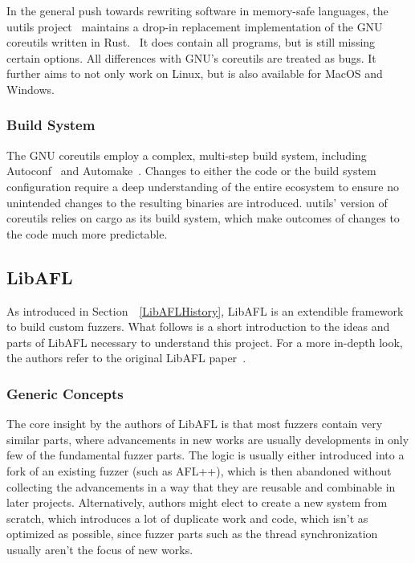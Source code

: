 \documentclass{article}
\let\savedCite=\cite
\renewcommand{\cite}{\unskip~\savedCite}
\let\savedRef=\ref
\renewcommand{\ref}{\unskip~\savedRef}
\begin{document}
\begin{multicols}{2}
    In the general push towards rewriting software in memory-safe languages, the uutils project\cite{Uutils} maintains a drop-in replacement implementation of the GNU coreutils written in Rust.\cite{UutilsCoreUtils} It does contain all programs, but is still missing certain options. All differences with GNU's coreutils are treated as bugs. It further aims to not only work on Linux, but is also available for MacOS and Windows.

    \subsubsection{Build System}
    \label{CoreutilsBuildSystem}

    The GNU coreutils employ a complex, multi-step build system, including Autoconf\cite{Autoconf} and Automake\cite{Automake}. Changes to either the code or the build system configuration require a deep understanding of the entire ecosystem to ensure no unintended changes to the resulting binaries are introduced. uutils' version of coreutils relies on cargo as its build system, which make outcomes of changes to the code much more predictable.

    \subsection{LibAFL}
    \label{LibAFLBackground}
    As introduced in Section~\ref{LibAFLHistory}, LibAFL is an extendible framework to build custom fuzzers. What follows is a short introduction to the ideas and parts of LibAFL necessary to understand this project. For a more in-depth look, the authors refer to the original LibAFL paper\cite{LibAFL}.

    \subsubsection{Generic Concepts}
    The core insight by the authors of LibAFL is that most fuzzers contain very similar parts, where advancements in new works are usually developments in only few of the fundamental fuzzer parts. The logic is usually either introduced into a fork of an existing fuzzer (such as AFL++), which is then abandoned without collecting the advancements in a way that they are reusable and combinable in later projects. Alternatively, authors might elect to create a new system from scratch, which introduces a lot of duplicate work and code, which isn't as optimized as possible, since fuzzer parts such as the thread synchronization usually aren't the focus of new works.

\end{multicols}
\end{document}
